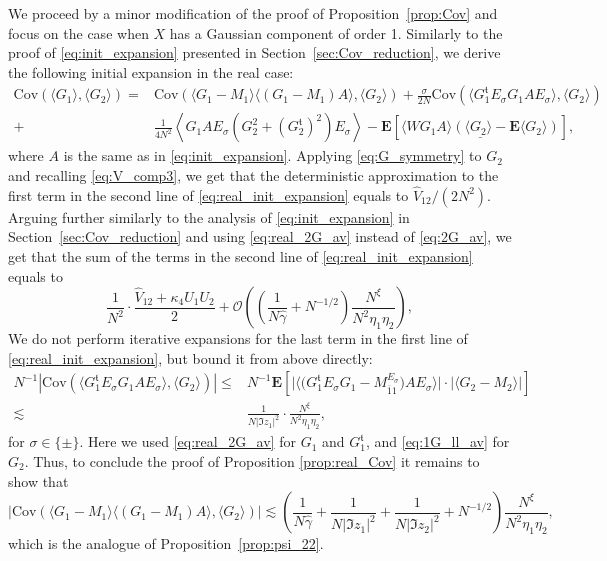 \documentclass[10pt]{amsart}
\numberwithin{equation}{section}
\newcommand{\E}{\mathbf{E}}
\begin{document}
We proceed by a minor modification of the proof of Proposition~\ref{prop:Cov} and focus on the case when $X$ has a Gaussian component of order 1. Similarly to the proof of \eqref{eq:init_expansion} presented in Section~\ref{sec:Cov_reduction}, we derive the following initial expansion in the real case:
\begin{equation}
\begin{split}
\mathrm{Cov}\left(\langle G_1\rangle,\langle G_2\rangle\right) =& \mathrm{Cov}\left(\langle G_1-M_1\rangle \langle (G_1-M_1)A\rangle, \langle G_2\rangle\right) + \frac{\sigma}{2N}\mathrm{Cov}\left(\langle G^\mathfrak{t}_1E_\sigma G_1AE_\sigma\rangle,\langle G_2\rangle\right)\\
+&\frac{1}{4N^2}\left\langle G_1AE_\sigma \left(G_2^2 + (G_2^\mathfrak{t})^2\right)E_\sigma\right\rangle - \E\left[\underline{\langle WG_1A\rangle \left(\langle G_2\rangle-\E\langle G_2\rangle\right)}\right],
\end{split}
\label{eq:real_init_expansion}
\end{equation}
where $A$ is the same as in \eqref{eq:init_expansion}. Applying \eqref{eq:G_symmetry} to $G_2$ and recalling \eqref{eq:V_comp3}, we get that the deterministic approximation to the first term in the second line of \eqref{eq:real_init_expansion} equals to $\widehat{V}_{12}/(2N^2)$. Arguing further similarly to the analysis of \eqref{eq:init_expansion} in Section~\ref{sec:Cov_reduction} and using \eqref{eq:real_2G_av} instead of \eqref{eq:2G_av}, we get that the sum of the terms in the second line of \eqref{eq:real_init_expansion} equals to 
\begin{equation}
\frac{1}{N^2}\cdot \frac{\widehat{V}_{12}+\kappa_4U_1U_2}{2} + \mathcal{O}\left(\left(\frac{1}{N\widehat{\gamma}}+N^{-1/2}\right)\frac{N^\xi}{N^2\eta_1\eta_2}\right),
\end{equation} 
We do not perform iterative expansions for the last term in the first line of \eqref{eq:real_init_expansion}, but bound it from above directly:
\begin{equation}
\begin{split}
N^{-1}\left\vert\mathrm{Cov}\left(\langle G^\mathfrak{t}_1E_\sigma G_1AE_\sigma\rangle,\langle G_2\rangle\right)\right\vert \le &N^{-1}\E \left[ \big\vert \big\langle \big( G^\mathfrak{t}_1E_\sigma G_1 -M_{\overline{1}1}^{E_\sigma}\big)AE_\sigma\big\rangle\big\vert\cdot \big\vert \langle G_2-M_2\rangle\big\vert\right]\\
\lesssim &\frac{1}{N|\Im z_1|^2}\cdot\frac{N^\xi}{N^2\eta_1\eta_2},
\end{split}
\end{equation}
for $\sigma\in\{\pm\}$. Here we used \eqref{eq:real_2G_av} for $G_1$ and $G_1^\mathfrak{t}$, and \eqref{eq:1G_ll_av} for $G_2$. Thus, to conclude the proof of Proposition \ref{prop:real_Cov} it remains to show that
\begin{equation}
\left\vert\mathrm{Cov}\left(\langle G_1-M_1\rangle \langle (G_1-M_1)A\rangle, \langle G_2\rangle\right)\right\vert \lesssim \left(\frac{1}{N\widehat{\gamma}}+\frac{1}{N|\Im z_1|^2}+\frac{1}{N|\Im z_2|^2} +N^{-1/2}\right)\frac{N^\xi}{N^2\eta_1\eta_2},
\label{eq:real_psi22}
\end{equation}
which is the analogue of Proposition~\ref{prop:psi_22}.
\end{document}
